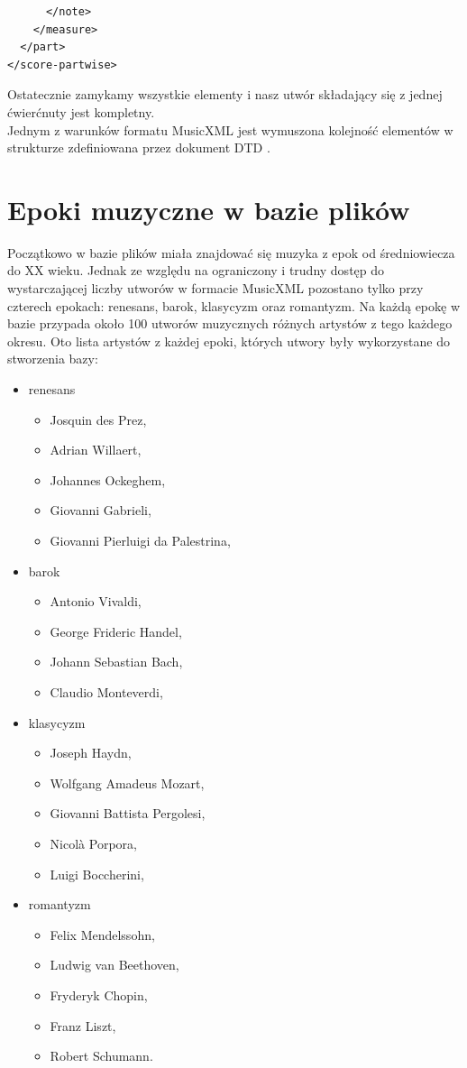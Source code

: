\documentclass[printmode, eng]{mgr}
\newcommand\tab[1][1cm]{\hspace*{#1}}
\begin{document}
\begin{lstlisting}
      </note>
    </measure>
  </part>
</score-partwise>
\end{lstlisting}
Ostatecznie zamykamy wszystkie elementy i nasz utwór składający się z jednej ćwierćnuty jest kompletny.\\

\tab Jednym z warunków formatu MusicXML jest wymuszona kolejność elementów w strukturze zdefiniowana przez dokument DTD \cite{mxml}. 
\section{Epoki muzyczne w bazie plików}
\tab Początkowo w bazie plików miała znajdować się muzyka z epok od średniowiecza do XX wieku. Jednak ze względu na ograniczony i trudny dostęp do wystarczającej liczby utworów w formacie MusicXML pozostano tylko przy czterech epokach: renesans, barok, klasycyzm oraz romantyzm. Na każdą epokę w bazie przypada około 100 utworów muzycznych różnych artystów z tego każdego okresu. Oto lista artystów z każdej epoki, których utwory były wykorzystane do stworzenia bazy:
\begin{itemize}
\item renesans
\begin{itemize}
\item Josquin des Prez,
\item Adrian Willaert,
\item Johannes Ockeghem,
\item Giovanni Gabrieli,
\item Giovanni Pierluigi da Palestrina,
\end{itemize}
\item barok
\begin{itemize}
\item Antonio Vivaldi,
\item George Frideric Handel,
\item Johann Sebastian Bach,
\item Claudio Monteverdi,
\end{itemize}
\item klasycyzm
\begin{itemize}
\item Joseph Haydn,
\item Wolfgang Amadeus Mozart,
\item Giovanni Battista Pergolesi,
\item Nicolà Porpora,
\item Luigi Boccherini,
\end{itemize}
\item romantyzm
\begin{itemize}
\item Felix Mendelssohn,
\item Ludwig van Beethoven,
\item Fryderyk Chopin,
\item Franz Liszt,
\item Robert Schumann.
\end{itemize}
\end{itemize}
\end{document}

